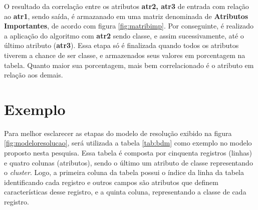 O resultado da correlação entre os atributos \textbf{atr2, atr3} de entrada com relação ao \textbf{atr1}, sendo saída, é armazanado em uma matriz denominada de \textbf{Atributos Importantes}, de acordo com figura \ref{fig:matribimp}. Por conseguinte, é realizado a aplicação do algoritmo com \textbf{atr2} sendo classe, e assim sucessivamente, até o último atributo (\textbf{atr3}). Essa etapa só é finalizada quando todos os atributos tiverem a chance de ser classe, e armazenados seus valores em porcentagem na tabela. Quanto maior sua porcentagem, mais bem correlacionado é o atributo em relação aos demais.

\section{Exemplo} \label{cap:ferramentas:sec:exebasemodfic}

Para melhor esclarecer as etapas do modelo de resolução exibido na figura \ref{fig:modeloresolucao}, será utilizada a tabela \ref{tab:bdm} como exemplo no modelo proposto nesta pesquisa. Essa tabela é composta por cinquenta registros (linhas) e quatro colunas (atributos), sendo o último um atributo de classe representando o \textit{cluster}. Logo, a primeira coluna da tabela possui o índice da linha da tabela identificando cada registro e outros campos são atributos que definem características desse registro, e a quinta coluna, representando a classe de cada registro.

